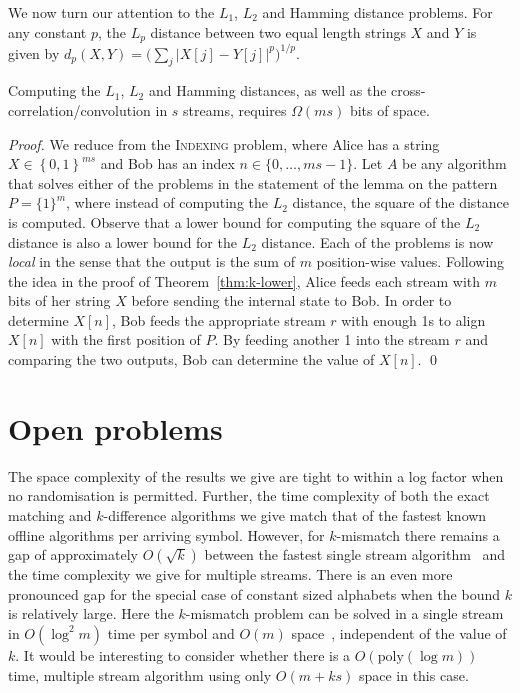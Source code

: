 \documentclass[envcountsame]{llncs}
\newcommand{\indexing}{\textsc{Indexing}\xspace}
\begin{document}
We now turn our attention to the $L_{1}$, $L_{2}$ and Hamming distance problems. For any constant $p$, the $L_p$ distance between two equal length strings $X$ and $Y$ is given by $d_p(X,Y)=\big(\sum_{j} |X[j]-Y[j]|^p\big)^{1/p}$.

\begin{theorem}
    Computing the $L_{1}$, $L_{2}$ and Hamming distances, as well as the cross-correlation/convolution in $s$ streams, requires $\Omega(ms)$ bits of space.
\end{theorem}
\begin{proof}
    We reduce from the \indexing problem, where Alice has a string $X\in\left\{ 0,1\right\}^{ms}$ and Bob has an index $n\in\{0,\ldots, ms-1\}$. Let $A$ be any algorithm that solves either of the problems in the statement of the lemma on the pattern $P=\{1\}^m$, where instead of computing the
    $L_2$ distance, the square of the distance is computed. Observe that a lower bound for computing the square of the $L_2$ distance is also a lower bound for the $L_2$ distance. Each of the problems is now \emph{local} in the sense that the output is the sum of $m$ position-wise values. Following the idea in the proof of Theorem~\ref{thm:k-lower}, Alice feeds each stream with $m$ bits of her string $X$ before sending the internal state to Bob. In order to determine $X[n]$, Bob feeds the appropriate stream $r$ with enough 1s to align $X[n]$ with the first position of $P$. By feeding another 1 into the stream $r$ and comparing the two outputs, Bob can determine the value of $X[n]$.
    \qed
\end{proof}


\section{Open problems}\label{sec:open}

The space complexity of the results we give are tight to within a log factor when no randomisation is permitted. Further, the time complexity of both the exact matching and $k$-difference algorithms we give match that of the fastest known offline algorithms per arriving symbol.  However, for $k$-mismatch there remains a gap of approximately $O(\sqrt{k})$ between the fastest single stream algorithm~\cite{CS:2010} and the time complexity we give for multiple streams. There is an even more pronounced gap for the special case of constant sized alphabets when the bound $k$ is relatively large. Here the $k$-mismatch problem can be solved in a single stream in $O(\log^2 m)$ time per symbol and $O(m)$ space~\cite{CEPP:2008}, independent of the value of $k$. It would be interesting to consider whether there is a $O(\text{poly}(\log m))$ time, multiple stream algorithm using only $O(m+ks)$ space in this case.
\end{document}
